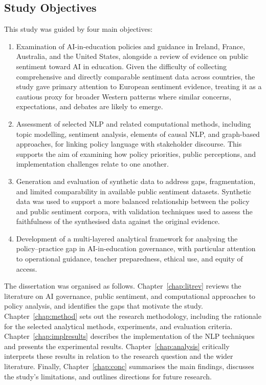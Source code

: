 \subsection*{Study Objectives}

This study was guided by four main objectives:

\begin{enumerate}
    \item Examination of AI-in-education policies and guidance in Ireland, France,
    Australia, and the United States, alongside a review of evidence on public
    sentiment toward AI in education. Given the difficulty of collecting
    comprehensive and directly comparable sentiment data across countries, the study
    gave primary attention to European sentiment evidence, treating it as a cautious
    proxy for broader Western patterns where similar concerns, expectations, and
    debates are likely to emerge.

    \item Assessment of selected NLP and related computational methods, including
    topic modelling, sentiment analysis, elements of causal NLP, and graph-based
    approaches, for linking policy language with stakeholder discourse. This supports
    the aim of examining how policy priorities, public perceptions, and
    implementation challenges relate to one another.

    \item Generation and evaluation of synthetic data to address gaps,
    fragmentation, and limited comparability in available public sentiment datasets.
    Synthetic data was used to support a more balanced relationship between the
    policy and public sentiment corpora, with validation techniques used to assess
    the faithfulness of the synthesised data against the original evidence.

    \item Development of a multi-layered analytical framework for analysing the
    policy--practice gap in AI-in-education governance, with particular attention to
    operational guidance, teacher preparedness, ethical use, and equity of access.
\end{enumerate}


The dissertation was organised as follows. Chapter~\ref{chap:litrev} reviews the
literature on AI governance, public sentiment, and computational approaches to
policy analysis, and identifies the gaps that motivate the study.
Chapter~\ref{chap:method} sets out the research methodology, including the rationale
for the selected analytical methods, experiments, and evaluation criteria.
Chapter~\ref{chap:implresults} describes the implementation of the NLP techniques
and presents the experimental results. Chapter~\ref{chap:analysis} critically
interprets these results in relation to the research question and the wider
literature. Finally, Chapter~\ref{chap:conc} summarises the main findings,
discusses the study's limitations, and outlines directions for future research.